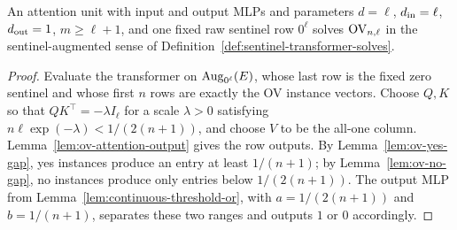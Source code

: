 \begin{theorem}
  \label{thm:transformer-solves-ov}
  An attention unit with input and output MLPs and parameters
  $d=\ell$, $d_{\rm in}=\ell$, $d_{\rm out}=1$, $m\geq\ell+1$, and one fixed
  raw sentinel row $0^\ell$ solves $\mathrm{OV}_{n,\ell}$ in the
  sentinel-augmented sense of Definition~\ref{def:sentinel-transformer-solves}.
\end{theorem}
\begin{proof}
  Evaluate the transformer on $\operatorname{Aug}_{0^\ell}(E)$, whose last row is the fixed
  zero sentinel and whose first $n$ rows are exactly the OV instance vectors.
  Choose $Q,K$ so that
  $QK^\top=-\lambda I_\ell$ for a scale $\lambda>0$ satisfying
  $n\ell\exp(-\lambda)<1/(2(n+1))$, and choose $V$ to be the all-one column.
  Lemma~\ref{lem:ov-attention-output} gives the row outputs.  By
  Lemma~\ref{lem:ov-yes-gap}, yes instances produce an entry at least
  $1/(n+1)$; by Lemma~\ref{lem:ov-no-gap}, no instances produce only entries
  below $1/(2(n+1))$.  The output MLP from
  Lemma~\ref{lem:continuous-threshold-or}, with
  $a=1/(2(n+1))$ and $b=1/(n+1)$, separates these two ranges and outputs $1$ or
  $0$ accordingly.
\end{proof}

